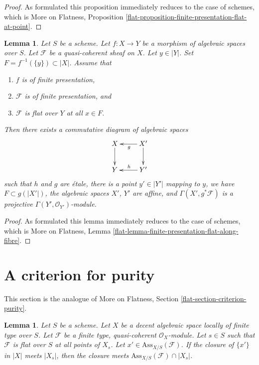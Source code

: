 \documentclass{stacks-project}
\theoremstyle{plain}
\newtheorem{lemma}[subsection]{Lemma}
\theoremstyle{definition}
\theoremstyle{remark}
\numberwithin{equation}{subsection}
\begin{document}
\begin{proof}
As formulated this proposition immediately reduces
to the case of schemes, which is
More on Flatness, Proposition
\ref{flat-proposition-finite-presentation-flat-at-point}.
\end{proof}

\begin{lemma}
\label{lemma-finite-presentation-flat-along-fibre}
Let $S$ be a scheme.
Let $f : X \to Y$ be a morphism of algebraic spaces over $S$.
Let $\mathcal{F}$ be a quasi-coherent sheaf on $X$.
Let $y \in |Y|$. Set $F = f^{-1}(\{y\}) \subset |X|$. Assume that
\begin{enumerate}
\item $f$ is of finite presentation,
\item $\mathcal{F}$ is of finite presentation, and
\item $\mathcal{F}$ is flat over $Y$ at all $x \in F$.
\end{enumerate}
Then there exists a commutative diagram of algebraic spaces
$$
\xymatrix{
X \ar[d] & X' \ar[l]^g \ar[d] \\
Y & Y' \ar[l]_h
}
$$
such that $h$ and $g$ are \'etale, there is a point
$y' \in |Y'|$ mapping to $y$, we have $F \subset g(|X'|)$,
the algebraic spaces $X'$, $Y'$ are affine, and
$\Gamma(X', g^*\mathcal{F})$ is a projective
$\Gamma(Y', \mathcal{O}_{Y'})$-module.
\end{lemma}

\begin{proof}
As formulated this lemma immediately reduces
to the case of schemes, which is
More on Flatness, Lemma
\ref{flat-lemma-finite-presentation-flat-along-fibre}.
\end{proof}




\section{A criterion for purity}
\label{section-criterion-purity}

\noindent
This section is the analogue of More on Flatness, Section
\ref{flat-section-criterion-purity}.

\begin{lemma}
\label{lemma-associated-point-specializes}
Let $S$ be a scheme. Let $X$ be a decent algebraic space
locally of finite type over $S$.
Let $\mathcal{F}$ be a finite type, quasi-coherent $\mathcal{O}_X$-module.
Let $s \in S$ such that $\mathcal{F}$ is flat over $S$ at all points of $X_s$.
Let $x' \in \text{Ass}_{X/S}(\mathcal{F})$. If
the closure of $\{x'\}$ in $|X|$ meets $|X_s|$, then the closure
meets $\text{Ass}_{X/S}(\mathcal{F}) \cap |X_s|$.
\end{lemma}
\end{document}
